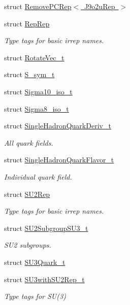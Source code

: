 \begin{DoxyCompactItemize}
struct \mbox{\hyperlink{structHadron_1_1RemovePCRep_3_01J9o2uRep_01_4}{Remove\+P\+C\+Rep$<$ J9o2u\+Rep $>$}}
\item 
struct \mbox{\hyperlink{structHadron_1_1RepRep}{Rep\+Rep}}
\begin{DoxyCompactList}\small\item\em Type tags for basic irrep names. \end{DoxyCompactList}\item 
struct \mbox{\hyperlink{structHadron_1_1RotateVec__t}{Rotate\+Vec\+\_\+t}}
\item 
struct \mbox{\hyperlink{structHadron_1_1S__sym__t}{S\+\_\+sym\+\_\+t}}
\item 
struct \mbox{\hyperlink{structHadron_1_1Sigma10__iso__t}{Sigma10\+\_\+iso\+\_\+t}}
\item 
struct \mbox{\hyperlink{structHadron_1_1Sigma8__iso__t}{Sigma8\+\_\+iso\+\_\+t}}
\item 
struct \mbox{\hyperlink{structHadron_1_1SingleHadronQuarkDeriv__t}{Single\+Hadron\+Quark\+Deriv\+\_\+t}}
\begin{DoxyCompactList}\small\item\em All quark fields. \end{DoxyCompactList}\item 
struct \mbox{\hyperlink{structHadron_1_1SingleHadronQuarkFlavor__t}{Single\+Hadron\+Quark\+Flavor\+\_\+t}}
\begin{DoxyCompactList}\small\item\em Individual quark field. \end{DoxyCompactList}\item 
struct \mbox{\hyperlink{structHadron_1_1SU2Rep}{S\+U2\+Rep}}
\begin{DoxyCompactList}\small\item\em Type tags for basic irrep names. \end{DoxyCompactList}\item 
struct \mbox{\hyperlink{structHadron_1_1SU2SubgroupSU3__t}{S\+U2\+Subgroup\+S\+U3\+\_\+t}}
\begin{DoxyCompactList}\small\item\em S\+U2 subgroups. \end{DoxyCompactList}\item 
struct \mbox{\hyperlink{structHadron_1_1SU3Quark__t}{S\+U3\+Quark\+\_\+t}}
\item 
struct \mbox{\hyperlink{structHadron_1_1SU3withSU2Rep__t}{S\+U3with\+S\+U2\+Rep\+\_\+t}}
\begin{DoxyCompactList}\small\item\em Type tags for S\+U(3) \end{DoxyCompactList}\item 

\end{DoxyCompactItemize}
